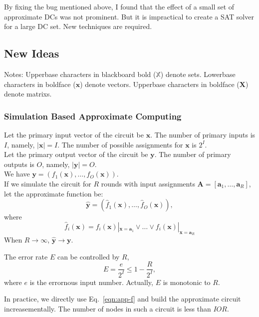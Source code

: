 \documentclass{rpt}
\begin{document}
By fixing the bug mentioned above,
I found that the effect of a small set of approximate DCs was not prominent.
But it is impractical to create a SAT solver for a large DC set.
New techniques are required.

\subsection{New Ideas}
Notes:
Upperbase characters in blackboard bold ($\mathbb{X}$) denote sets.
Lowerbase characters in boldface ($\mathbf{x}$) denote vectors.
Upperbase characters in boldface ($\mathbf{X}$) denote matrixs.


\subsubsection{Simulation Based Approximate Computing}
Let the primary input vector of the circuit be $\mathbf{x}$.
The number of primary inputs is $I$,
namely,
$|\mathbf{x}| = I$.
The number of possible assignments for $\mathbf{x}$ is $2^I$. \\
Let the primary output vector of the circuit be $\mathbf{y}$.
The number of primary outputs is $O$,
namely,
$|\mathbf{y}| = O$. \\
We have $\mathbf{y} = (f_1(\mathbf{x}), \ldots, f_O(\mathbf{x}))$. \\
If we simulate the circuit for $R$ rounds with input assignments $\mathbf{A} = [\mathbf{a}_1, \ldots, \mathbf{a}_R]$,
let the approximate function be:
\begin{equation}
    \label{eqn:app-f}
    \mathbf{\hat{y}} = (\hat{f}_1(\mathbf{x}), \ldots, \hat{f}_O(\mathbf{x})),
\end{equation}
where
\[
    \hat{f}_i(\mathbf{x}) = f_i(\mathbf{x})|_{\mathbf{x} = \mathbf{a}_1} \lor \ldots \lor f_i(\mathbf{x})|_{\mathbf{x} = \mathbf{a}_R}
\]
When $R\rightarrow \infty$, $\mathbf{\hat{y}} \rightarrow \mathbf{y}$.

The error rate $E$ can be controlled by $R$,
\[
    E = \frac{e}{2^I} \leq 1 - \frac{R}{2^I},
\]
where $e$ is the errornous input number.
Actually,
$E$ is monotonic to $R$.

In practice,
we directly use Eq.~\eqref{eqn:app-f} and build the approximate circuit increasementally.
The number of nodes in such a circuit is less than $IOR$.
\end{document}
